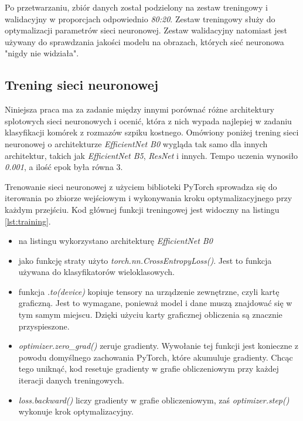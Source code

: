 Po przetwarzaniu, zbiór danych został podzielony na zestaw treningowy i walidacyjny w proporcjach odpowiednio \textit{80:20}.
Zestaw treningowy służy do optymalizacji parametrów sieci neuronowej.
Zestaw walidacyjny natomiast jest używany do sprawdzania jakości modelu na obrazach, których sieć neuronowa "nigdy nie widziała".

\subsection{Trening sieci neuronowej}

Niniejsza praca ma za zadanie między innymi porównać różne architektury splotowych sieci neuronowych i ocenić,
która z nich wypada najlepiej w zadaniu klasyfikacji komórek z rozmazów szpiku kostnego.
Omówiony poniżej trening sieci neuronowej o architekturze \textit{EfficientNet B0} wygląda tak samo dla innych architektur, takich jak \textit{EfficientNet B5}, \textit{ResNet} i innych.
Tempo uczenia wynosiło \textit{0.001}, a ilość epok była równa 3.

Trenowanie sieci neuronowej z użyciem biblioteki PyTorch sprowadza się do iterowania po zbiorze wejściowym i wykonywania kroku optymalizacyjnego przy każdym przejściu.
Kod głównej funkcji treningowej jest widoczny na listingu \ref{lst:training}.

\begin{itemize}
    \item na listingu wykorzystano architekturę \textit{EfficientNet B0}
    \item jako funkcję straty użyto \textit{torch.nn.CrossEntropyLoss()}.
    Jest to funkcja używana do klasyfikatorów wieloklasowych.
    \item funkcja \textit{.to(device)} kopiuje tensory na urządzenie zewnętrzne, czyli kartę graficzną.
    Jest to wymagane, ponieważ model i dane muszą znajdować się w tym samym miejscu.
    Dzięki użyciu karty graficznej obliczenia są znacznie przyspieszone.
    \item \textit{optimizer.zero\_grad()} zeruje gradienty.
    Wywołanie tej funkcji jest konieczne z powodu domyślnego zachowania PyTorch, które akumuluje gradienty.
    Chcąc tego uniknąć, kod resetuje gradienty w grafie obliczeniowym przy każdej iteracji danych treningowych.
    \item \textit{loss.backward()} liczy gradienty w grafie obliczeniowym, zaś \textit{optimizer.step()} wykonuje krok optymalizacyjny.
\end{itemize}




